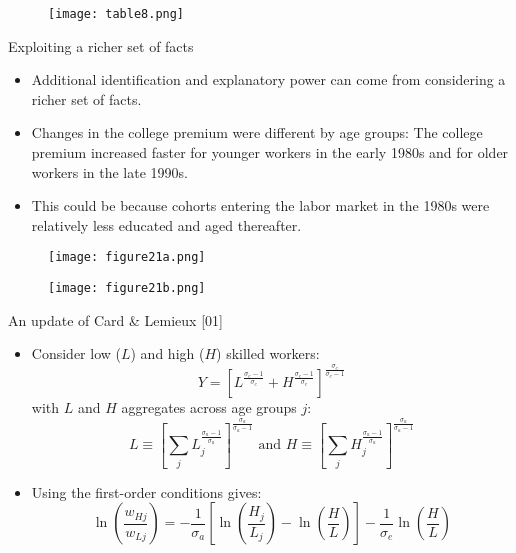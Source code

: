 \documentclass[notes=show]{beamer}
\begin{document}
\newpage
\begin{center}
\begin{figure}
\texttt{[image: table8.png]}
\end{figure} 
\end{center}
\newpage

\begin{frame}{Exploiting a richer set of facts}
\begin{itemize}
\item Additional identification and explanatory power can come from considering a richer set of facts. \medskip
\item Changes in the college premium were different by age groups: The college premium increased faster for younger workers in the early 1980s and for older workers in the late 1990s. \medskip
\item This could be because cohorts entering the labor market in the 1980s were relatively less educated and aged thereafter.
\end{itemize}
\end{frame}

\newpage
\begin{center}
\begin{figure}
\texttt{[image: figure21a.png]}
\end{figure} 
\end{center}
\newpage

\newpage
\begin{center}
\begin{figure}
\texttt{[image: figure21b.png]}
\end{figure} 
\end{center}
\newpage

\begin{frame}{An update of Card \& Lemieux [01]}
\begin{itemize}
\item Consider low ($L$) and high ($H$) skilled workers:
\[
Y=[L^{ \frac{\sigma_{e} -1}{\sigma_{e}}} + H^{ \frac{\sigma_{e} -1}{\sigma_{e}}}]^{\frac{\sigma_{e}}{\sigma_{e}-1}}
\]
with $L$ and $H$ aggregates across age groups $j$:
\[
L \equiv [\sum_{j}^{} L_{j}^{\frac{\sigma_{a} -1}{\sigma_{a}}}]^{\frac{\sigma_{a}}{\sigma_{a}-1}} \text{ and } 
H \equiv [\sum_{j}^{} H_{j}^{\frac{\sigma_{a} -1}{\sigma_{a}}}]^{\frac{\sigma_{a}}{\sigma_{a}-1}}
\]
\item Using the first-order conditions gives:
\[
\ln(\frac{w_{Hj}}{w_{Lj}})= - \frac{1}{\sigma_{a}}[\ln(\frac{H_{j}}{L_{j}})- \ln(\frac{H}{L})] - \frac{1}{\sigma_{e}} \ln(\frac{H}{L})
\]
\end{itemize}
\end{frame}
\end{document}
